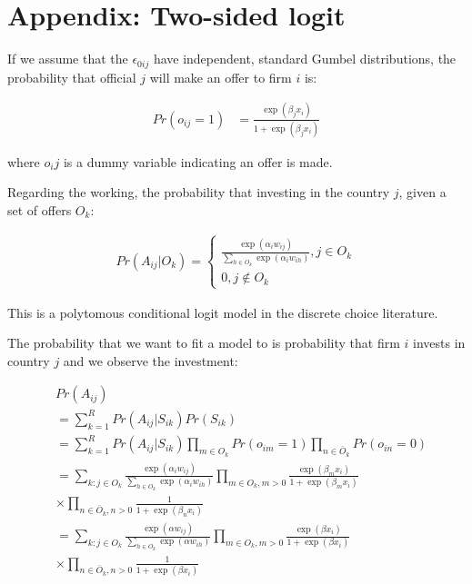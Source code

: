 \section{Appendix: Two-sided logit}

If we assume that the $\epsilon_{0ij}$ have independent, standard Gumbel distributions, the probability that official $j$ will make an offer to firm $i$ is:

\begin{align}
Pr(o_{ij} = 1) &= \frac{\exp(\beta_j x_i)}{1 + \exp(\beta_j x_i)}
\end{align}

where $o_ij$ is a dummy variable indicating an offer is made.

Regarding the working, the probability that investing in the country $j$, given a set of offers $O_k$:

\begin{align}
Pr(A_{ij} | O_k) =\begin{cases}
\frac{\exp(\alpha_i w_{ij})}{\displaystyle \sum_{h \in O_k} \exp(\alpha_i w_{ih})}, j \in O_k\\
0, j \notin O_k
\end{cases}
\end{align}

This is a polytomous conditional logit model in the discrete choice literature.

The probability that we want to fit a model to is probability that firm $i$ invests in country $j$ and we observe the investment:

\begin{align}
&Pr(A_{ij}) \\
&= \sum_{k=1}^R Pr(A_{ij}|S_{ik}) Pr(S_{ik}) \\
&= \sum_{k=1}^R Pr(A_{ij} | S_{ik}) \prod_{m \in O_k} Pr(o_{im} = 1) \prod_{n \in \bar O_k} Pr(o_{in} = 0) \\
&= \sum_{k:j \in O_k} \frac{\exp(\alpha_i w_{ij})}{\displaystyle\sum_{h \in O_k} \exp(\alpha_i w_{ih})} \prod_{m \in O_k, m > 0} \frac{\exp(\beta_m x_{i})}{1 + \exp(\beta_m x_i)} \\
&\times \prod_{n \in \bar O_k, n > 0} \frac{1}{1 + \exp(\beta_n x_i)} \\
&= \sum_{k:j \in O_k} \frac{\exp(\alpha w_{ij})}{\displaystyle\sum_{h \in O_k} \exp(\alpha w_{ih})} \prod_{m \in O_k, m > 0} \frac{\exp(\beta x_{i})}{1 + \exp(\beta x_i)} \\
&\times \prod_{n \in \bar O_k, n > 0} \frac{1}{1 + \exp(\beta x_i)}
\end{align}
